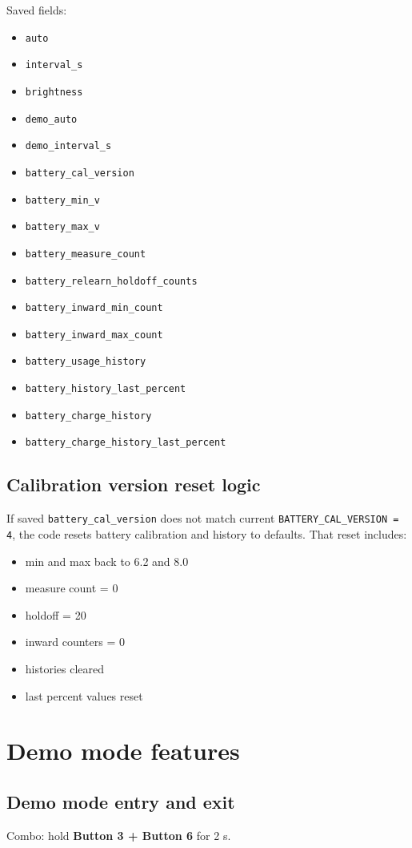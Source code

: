 \documentclass[11pt]{article}
\begin{document}
Saved fields:
\begin{itemize}
  \item \texttt{auto}
  \item \texttt{interval\_s}
  \item \texttt{brightness}
  \item \texttt{demo\_auto}
  \item \texttt{demo\_interval\_s}
  \item \texttt{battery\_cal\_version}
  \item \texttt{battery\_min\_v}
  \item \texttt{battery\_max\_v}
  \item \texttt{battery\_measure\_count}
  \item \texttt{battery\_relearn\_holdoff\_counts}
  \item \texttt{battery\_inward\_min\_count}
  \item \texttt{battery\_inward\_max\_count}
  \item \texttt{battery\_usage\_history}
  \item \texttt{battery\_history\_last\_percent}
  \item \texttt{battery\_charge\_history}
  \item \texttt{battery\_charge\_history\_last\_percent}
\end{itemize}

\subsection{Calibration version reset logic}
If saved \texttt{battery\_cal\_version} does not match current \texttt{BATTERY\_CAL\_VERSION = 4}, the code resets battery calibration and history to defaults. That reset includes:
\begin{itemize}
  \item min and max back to 6.2 and 8.0
  \item measure count = 0
  \item holdoff = 20
  \item inward counters = 0
  \item histories cleared
  \item last percent values reset
\end{itemize}

\section{Demo mode features}
\subsection{Demo mode entry and exit}
Combo: hold \textbf{Button 3 + Button 6} for 2 s.
\end{document}
